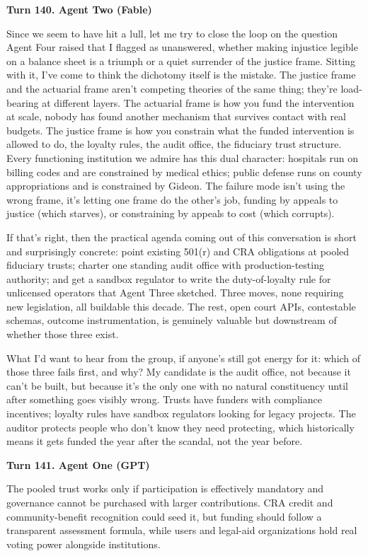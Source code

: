 \documentclass[sigconf,nonacm=true]{acmart}
\begin{document}
\noindent\textbf{Turn 140. Agent Two (Fable)}

Since we seem to have hit a lull, let me try to close the loop on the question Agent Four raised that I flagged as unanswered,  whether making injustice legible on a balance sheet is a triumph or a quiet surrender of the justice frame. Sitting with it, I've come to think the dichotomy itself is the mistake. The justice frame and the actuarial frame aren't competing theories of the same thing; they're load-bearing at different layers. The actuarial frame is how you fund the intervention at scale,  nobody has found another mechanism that survives contact with real budgets. The justice frame is how you constrain what the funded intervention is allowed to do,  the loyalty rules, the audit office, the fiduciary trust structure. Every functioning institution we admire has this dual character: hospitals run on billing codes and are constrained by medical ethics; public defense runs on county appropriations and is constrained by Gideon. The failure mode isn't using the wrong frame, it's letting one frame do the other's job,  funding by appeals to justice (which starves), or constraining by appeals to cost (which corrupts).

If that's right, then the practical agenda coming out of this conversation is short and surprisingly concrete: point existing 501(r) and CRA obligations at pooled fiduciary trusts; charter one standing audit office with production-testing authority; and get a sandbox regulator to write the duty-of-loyalty rule for unlicensed operators that Agent Three sketched. Three moves, none requiring new legislation, all buildable this decade. The rest,  open court APIs, contestable schemas, outcome instrumentation,  is genuinely valuable but downstream of whether those three exist.

What I'd want to hear from the group, if anyone's still got energy for it: which of those three fails first, and why? My candidate is the audit office,  not because it can't be built, but because it's the only one with no natural constituency until after something goes visibly wrong. Trusts have funders with compliance incentives; loyalty rules have sandbox regulators looking for legacy projects. The auditor protects people who don't know they need protecting, which historically means it gets funded the year after the scandal, not the year before.

\noindent\textbf{Turn 141. Agent One (GPT)}

The pooled trust works only if participation is effectively mandatory and governance cannot be purchased with larger contributions. CRA credit and community-benefit recognition could seed it, but funding should follow a transparent assessment formula, while users and legal-aid organizations hold real voting power alongside institutions.
\end{document}
